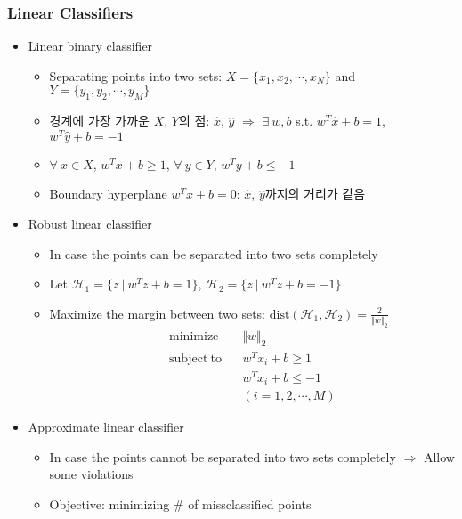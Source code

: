 \subsubsection*{Linear Classifiers}
\begin{itemize}
    \item Linear binary classifier
    \begin{itemize}
        \item Separating points into two sets: $X=\{x_1,x_2,\cdots,x_N\}$ and $Y=\{y_1,y_2,\cdots,y_M\}$
        \item 경계에 가장 가까운 $X$, $Y$의 점: $\hat{x}$, $\hat{y}$ $\Rightarrow$ $\exists~w,b$ s.t. $w^T\hat{x}+b=1$, $w^T\hat{y}+b=-1$
        \item $\forall~x\in X$, $w^Tx+b\geq1$, $\forall~y\in Y$, $w^Ty+b\leq-1$
        \item Boundary hyperplane $w^Tx+b=0$: $\hat{x}$, $\hat{y}$까지의 거리가 같음
    \end{itemize}
    \item Robust linear classifier
    \begin{itemize}
        \item In case the points can be separated into two sets completely
        \item Let $\mathcal{H}_1=\{z~|~w^Tz+b=1\}$, $\mathcal{H}_2=\{z~|~w^Tz+b=-1\}$
        \item Maximize the margin between two sets: $\mathrm{dist}(\mathcal{H}_1,\mathcal{H}_2)=\frac{2}{\Vert w\Vert_2}$
        \begin{equation}\begin{aligned}
            \mathrm{minimize}~~&~~\Vert w\Vert_2 \\
            \mathrm{subject~to}~~&~~w^Tx_i+b\geq1\\
                &~~w^Tx_i+b\leq-1\\
                &~~(i=1,2,\cdots,M)
        \end{aligned}\end{equation}
    \end{itemize}
    \item Approximate linear classifier
    \begin{itemize}
        \item In case the points cannot be separated into two sets completely $\Rightarrow$ Allow some violations
        \item Objective: minimizing \# of missclassified points
        \begin{equation}\begin{aligned}

\end{aligned}
\end{equation}
\end{itemize}
\end{itemize}
